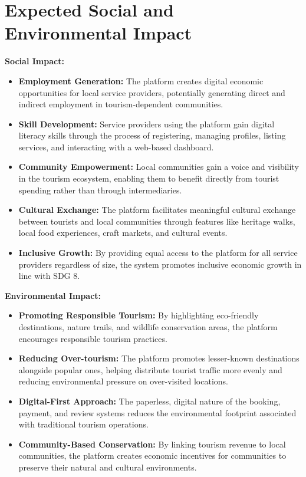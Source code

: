 \section{Expected Social and Environmental Impact}

\textbf{Social Impact:}
\begin{itemize}[leftmargin=2em]
    \item \textbf{Employment Generation:} The platform creates digital economic opportunities for local service providers, potentially generating direct and indirect employment in tourism-dependent communities.
    \item \textbf{Skill Development:} Service providers using the platform gain digital literacy skills through the process of registering, managing profiles, listing services, and interacting with a web-based dashboard.
    \item \textbf{Community Empowerment:} Local communities gain a voice and visibility in the tourism ecosystem, enabling them to benefit directly from tourist spending rather than through intermediaries.
    \item \textbf{Cultural Exchange:} The platform facilitates meaningful cultural exchange between tourists and local communities through features like heritage walks, local food experiences, craft markets, and cultural events.
    \item \textbf{Inclusive Growth:} By providing equal access to the platform for all service providers regardless of size, the system promotes inclusive economic growth in line with SDG 8.
\end{itemize}

\textbf{Environmental Impact:}
\begin{itemize}[leftmargin=2em]
    \item \textbf{Promoting Responsible Tourism:} By highlighting eco-friendly destinations, nature trails, and wildlife conservation areas, the platform encourages responsible tourism practices.
    \item \textbf{Reducing Over-tourism:} The platform promotes lesser-known destinations alongside popular ones, helping distribute tourist traffic more evenly and reducing environmental pressure on over-visited locations.
    \item \textbf{Digital-First Approach:} The paperless, digital nature of the booking, payment, and review systems reduces the environmental footprint associated with traditional tourism operations.
    \item \textbf{Community-Based Conservation:} By linking tourism revenue to local communities, the platform creates economic incentives for communities to preserve their natural and cultural environments.
\end{itemize}
